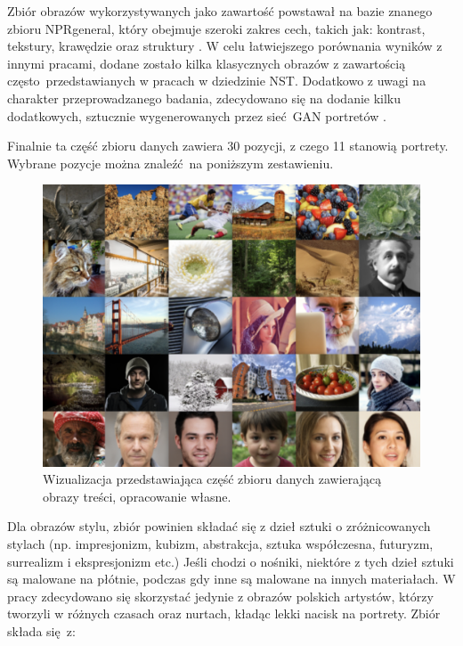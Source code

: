 \documentclass[12pt]{article}
\begin{document}
\indent

Zbiór obrazów wykorzystywanych jako zawartość powstawał na bazie znanego zbioru NPRgeneral, który obejmuje szeroki zakres cech, takich jak: kontrast, tekstury, krawędzie oraz struktury \cite{57}. W celu łatwiejszego porównania wyników z innymi pracami, dodane zostało kilka klasycznych obrazów z zawartością często przedstawianych w pracach w dziedzinie NST. Dodatkowo z uwagi na charakter przeprowadzanego badania, zdecydowano się na dodanie kilku dodatkowych, sztucznie wygenerowanych przez sieć GAN portretów \cite{58}.

Finalnie ta część zbioru danych zawiera 30 pozycji, z czego 11 stanowią portrety. Wybrane pozycje można znaleźć na poniższym zestawieniu.
\begin{figure}[H]
    \centering
    \includegraphics[width=\textwidth]{u11.png}
    \caption{Wizualizacja przedstawiająca część zbioru danych zawierającą obrazy treści, opracowanie własne.}
    \label{fig:8}
\end{figure}

Dla obrazów stylu, zbiór powinien składać się z dzieł sztuki o zróżnicowanych stylach (np. impresjonizm, kubizm, abstrakcja, sztuka współczesna, futuryzm, surrealizm i ekspresjonizm etc.) Jeśli chodzi o nośniki, niektóre z tych dzieł sztuki są malowane na płótnie, podczas gdy inne są malowane na innych materiałach. W pracy zdecydowano się skorzystać jedynie z obrazów polskich artystów, którzy tworzyli w różnych czasach oraz nurtach, kładąc lekki nacisk na portrety. Zbiór składa się z:
\end{document}

